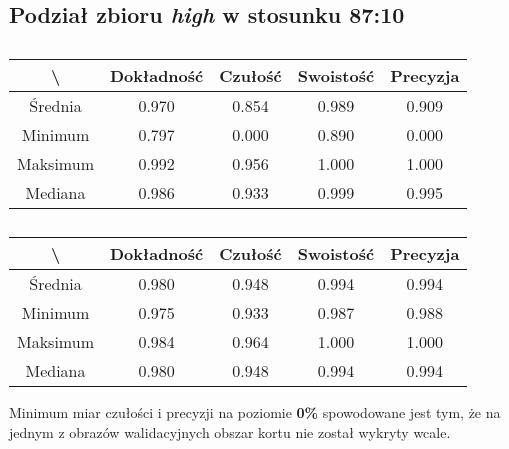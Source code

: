 \subsection{Podział zbioru \textit{high} w stosunku 87:10}


\begin{table}[H]
	\centering
	\caption{}
	\vspace{6pt}
	{\footnotesize
		\begin{tabular}{|c|c|c|c|c|}
      \hline \textbackslash & Dokładność & Czułość & Swoistość & Precyzja \\
      \hline Średnia & 0.970 & 0.854 & 0.989 & 0.909 \\
      \hline Minimum & 0.797 & 0.000 & 0.890 & 0.000 \\
      \hline Maksimum & 0.992 & 0.956 & 1.000 & 1.000 \\
      \hline Mediana & 0.986 & 0.933 & 0.999 & 0.995 \\
      \hline
    \end{tabular}
    \label{Tab:highsplitb_val}
	}
	\vspace{0pt}
\end{table}

\begin{table}[H]
	\centering
	\caption{}
	\vspace{6pt}
	{\footnotesize
		\begin{tabular}{|c|c|c|c|c|}
      \hline \textbackslash & Dokładność & Czułość & Swoistość & Precyzja \\
      \hline Średnia & 0.980 & 0.948 & 0.994 & 0.994 \\
      \hline Minimum & 0.975 & 0.933 & 0.987 & 0.988 \\
      \hline Maksimum & 0.984 & 0.964 & 1.000 & 1.000 \\
      \hline Mediana & 0.980 & 0.948 & 0.994 & 0.994 \\
      \hline
    \end{tabular}
    \label{Tab:highsplitb_test}
	}
	\vspace{0pt}
\end{table}

Minimum miar czułości i precyzji na poziomie \textbf{0\%} spowodowane jest tym, że na jednym z obrazów walidacyjnych obszar kortu nie został wykryty wcale.
